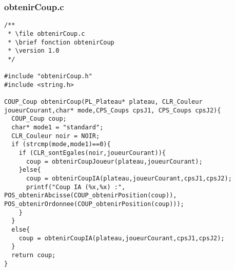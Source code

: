 \subsubsection{obtenirCoup.c}
\begin{lstlisting}
/**
 * \file obtenirCoup.c
 * \brief fonction obtenirCoup
 * \version 1.0
 */

#include "obtenirCoup.h"
#include <string.h>

COUP_Coup obtenirCoup(PL_Plateau* plateau, CLR_Couleur joueurCourant,char* mode,CPS_Coups cpsJ1, CPS_Coups cpsJ2){
  COUP_Coup coup;
  char* mode1 = "standard";
  CLR_Couleur noir = NOIR;
  if (strcmp(mode,mode1)==0){
    if (CLR_sontEgales(noir,joueurCourant)){
      coup = obtenirCoupJoueur(plateau,joueurCourant);
    }else{
      coup = obtenirCoupIA(plateau,joueurCourant,cpsJ1,cpsJ2);
      printf("Coup IA (%x,%x) :", POS_obtenirAbcisse(COUP_obtenirPosition(coup)), POS_obtenirOrdonnee(COUP_obtenirPosition(coup)));
    }
  }
  else{
    coup = obtenirCoupIA(plateau,joueurCourant,cpsJ1,cpsJ2);
  }
  return coup;
}
\end{lstlisting}

